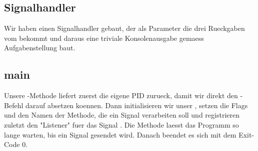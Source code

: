 
\subsection{Signalhandler}

    Wir haben einen Signalhandler gebaut, der als Parameter die drei Rueckgaben vom  bekommt und daraus eine triviale Konsolenausgabe gemaess Aufgabenstellung baut.

\subsection{main}

    Unsere -Methode liefert zuerst die eigene PID zurueck, damit wir direkt den -Befehl darauf absetzen koennen.
    Dann initialisieren wir unser , setzen die Flags und den Namen der Methode, die ein Signal verarbeiten soll und registrieren zuletzt den "Listener" fuer das Signal .
    Die Methode  laesst das Programm so lange warten, bis ein Signal gesendet wird. Danach beendet es sich mit dem Exit-Code 0.
